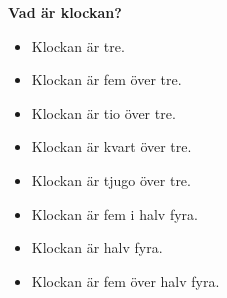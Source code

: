 
\begin{flushleft}
    \textbf{Vad är klockan?}
    \begin{itemize}
        \item Klockan är tre.
        \item Klockan är fem över tre.
        \item Klockan är tio över tre.
        \item Klockan är kvart över tre.
        \item Klockan är tjugo över tre.
        \item Klockan är fem i halv fyra.
        \item Klockan är halv fyra.
        \item Klockan är fem över halv fyra.
    \end{itemize}
\end{flushleft}
